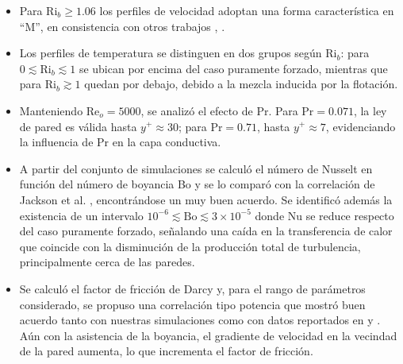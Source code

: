 \begin{itemize}

\item Para $\text{Ri}_b \geq 1\text{.}06$ los perfiles de velocidad adoptan una forma característica en ``M'', en consistencia con otros trabajos \cite{you2003direct}, \cite{zhou2024direct}.

\item Los perfiles de temperatura se distinguen en dos grupos según $\text{Ri}_b$: para $0 \lesssim \text{Ri}_b \lesssim 1$ se ubican por encima del caso puramente forzado, mientras que para $\text{Ri}_b \gtrsim 1$ quedan por debajo, debido a la mezcla inducida por la flotación.

\item Manteniendo $\text{Re}_o=5000$, se analizó el efecto de $\text{Pr}$. Para $\text{Pr}=0\text{.}071$, la ley de pared \cite{kawamura1998dns} es válida hasta $y^+ \approx 30$; para $\text{Pr}=0\text{.}71$, hasta $y^+ \approx 7$, evidenciando la influencia de $\text{Pr}$ en la capa conductiva.

\item A partir del conjunto de simulaciones se calculó el número de Nusselt en función del número de boyancia Bo y se lo comparó con la correlación de Jackson et al. \cite{jackson1989studies}, encontrándose un muy buen acuerdo. Se identificó además la existencia de un intervalo $10^{-6} \lesssim \text{Bo} \lesssim 3 \times 10^{-5}$ donde Nu se reduce respecto del caso puramente forzado, señalando una caída en la transferencia de calor que coincide con la disminución de la producción total de turbulencia, principalmente cerca de las paredes.

\item Se calculó el factor de fricción de Darcy y, para el rango de parámetros considerado, se propuso una correlación tipo potencia que mostró buen acuerdo tanto con nuestras simulaciones como con datos reportados en \cite{you2003direct} y \cite{parlatan1996buoyancy}. Aún con la asistencia de la boyancia, el gradiente de velocidad en la vecindad de la pared aumenta, lo que incrementa el factor de fricción.

\end{itemize} 

